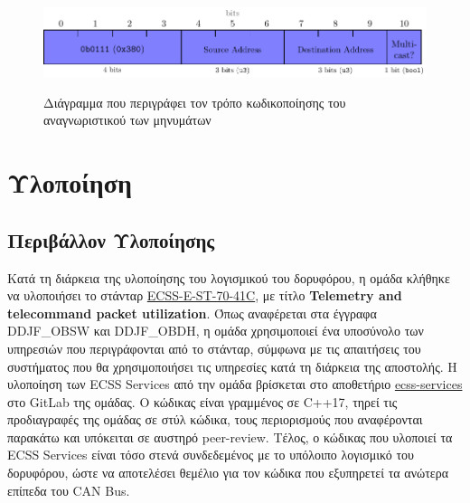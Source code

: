 \documentclass[a4paper,nobib,justified]{tufte-book}
\begin{document}
\begin{figure}[h]
	\includegraphics{media/diagrams/tp-message-id}
	\label{fig:tp-message-id}
	\cite{DDJF_OBDH}
	\caption{Διάγραμμα που περιγράφει τον τρόπο κωδικοποίησης του αναγνωριστικού των μηνυμάτων}
\end{figure}

\chapter{Υλοποίηση}
\label{implementation}
\section{Περιβάλλον Υλοποίησης}

Κατά τη διάρκεια της υλοποίησης του λογισμικού του δορυφόρου, η ομάδα κλήθηκε να υλοποιήσει το στάνταρ \href{url}{ECSS-E-ST-70-41C}, με τίτλο \textbf{Telemetry and telecommand packet utilization}. Όπως αναφέρεται στα έγγραφα DDJF\_OBSW και DDJF\_OBDH, η ομάδα χρησιμοποιεί ένα υποσύνολο των υπηρεσιών που περιγράφονται από το στάνταρ, σύμφωνα με τις απαιτήσεις του συστήματος που θα χρησιμοποιήσει τις υπηρεσίες κατά τη διάρκεια της αποστολής. Η υλοποίηση των ECSS Services από την ομάδα βρίσκεται στο αποθετήριο \href{https://gitlab.com/acubesat/obc/ecss-services}{ecss-services} στο GitLab της ομάδας. Ο κώδικας είναι γραμμένος σε C++17, τηρεί τις προδιαγραφές της ομάδας σε στύλ κώδικα, τους περιορισμούς που αναφέρονται παρακάτω και υπόκειται σε αυστηρό peer-review. Τέλος, ο κώδικας που υλοποιεί τα ECSS Services είναι τόσο στενά συνδεδεμένος με το υπόλοιπο λογισμικό του δορυφόρου, ώστε να αποτελέσει θεμέλιο για τον κώδικα που εξυπηρετεί τα ανώτερα επίπεδα του CAN Bus. 
\end{document}
